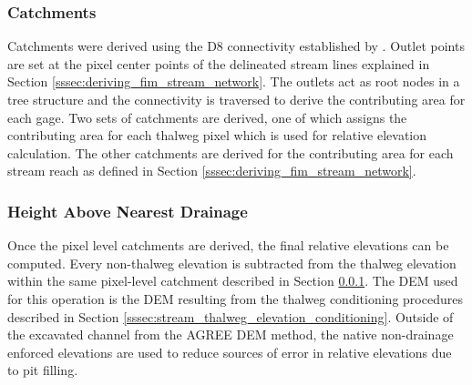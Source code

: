 \documentclass[draft]{dependencies/agujournal2019}
\begin{document}
\subsubsection{Catchments}
\label{sssec:catchments}
%
Catchments were derived using the D8 connectivity established by .
Outlet points are set at the pixel center points of the delineated stream lines explained in Section \ref{sssec:deriving_fim_stream_network}.
The outlets act as root nodes in a tree structure and the connectivity is traversed to derive the contributing area for each gage.
Two sets of catchments are derived, one of which assigns the contributing area for each thalweg pixel which is used for relative elevation calculation.
The other catchments are derived for the contributing area for each stream reach as defined in Section \ref{sssec:deriving_fim_stream_network}. 
%
\subsubsection{Height Above Nearest Drainage}
%
Once the pixel level catchments are derived, the final relative elevations can be computed.
Every non-thalweg elevation is subtracted from the thalweg elevation within the same pixel-level catchment described in Section \ref{sssec:catchments}.
The DEM used for this operation is the DEM resulting from the thalweg conditioning procedures described in Section \ref{sssec:stream_thalweg_elevation_conditioning}.
Outside of the excavated channel from the AGREE DEM method, the native non-drainage enforced elevations are used to reduce sources of error in relative elevations due to pit filling. 
%
\end{document}
